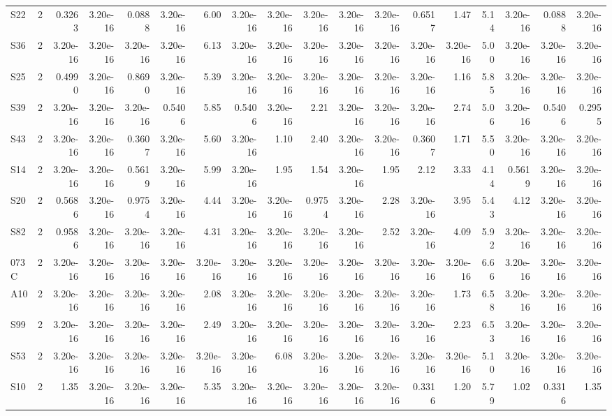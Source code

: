 {\begin{longtable}{lrrrrrrrrrrrrrrrrr}
  S22 & 2 & 0.3263 & 3.20e-16 & 0.0888 & 3.20e-16 & 6.00 & 3.20e-16 & 3.20e-16 & 3.20e-16 & 3.20e-16 & 3.20e-16 & 0.6517 & 1.47 & 5.14 & 3.20e-16 & 0.0888 & 3.20e-16 \\
  S36 & 2 & 3.20e-16 & 3.20e-16 & 3.20e-16 & 3.20e-16 & 6.13 & 3.20e-16 & 3.20e-16 & 3.20e-16 & 3.20e-16 & 3.20e-16 & 3.20e-16 & 3.20e-16 & 5.00 & 3.20e-16 & 3.20e-16 & 3.20e-16 \\
  S25 & 2 & 0.4990 & 3.20e-16 & 0.8690 & 3.20e-16 & 5.39 & 3.20e-16 & 3.20e-16 & 3.20e-16 & 3.20e-16 & 3.20e-16 & 3.20e-16 & 1.16 & 5.85 & 3.20e-16 & 3.20e-16 & 3.20e-16 \\
  S39 & 2 & 3.20e-16 & 3.20e-16 & 3.20e-16 & 0.5406 & 5.85 & 0.5406 & 3.20e-16 & 2.21 & 3.20e-16 & 3.20e-16 & 3.20e-16 & 2.74 & 5.06 & 3.20e-16 & 0.5406 & 0.2955 \\
  S43 & 2 & 3.20e-16 & 3.20e-16 & 0.3607 & 3.20e-16 & 5.60 & 3.20e-16 & 1.10 & 2.40 & 3.20e-16 & 3.20e-16 & 0.3607 & 1.71 & 5.50 & 3.20e-16 & 3.20e-16 & 3.20e-16 \\
  S14 & 2 & 3.20e-16 & 3.20e-16 & 0.5619 & 3.20e-16 & 5.99 & 3.20e-16 & 1.95 & 1.54 & 3.20e-16 & 1.95 & 2.12 & 3.33 & 4.14 & 0.5619 & 3.20e-16 & 3.20e-16 \\
  S20 & 2 & 0.5686 & 3.20e-16 & 0.9754 & 3.20e-16 & 4.44 & 3.20e-16 & 3.20e-16 & 0.9754 & 3.20e-16 & 2.28 & 3.20e-16 & 3.95 & 5.43 & 4.12 & 3.20e-16 & 3.20e-16 \\
  S82 & 2 & 0.9586 & 3.20e-16 & 3.20e-16 & 3.20e-16 & 4.31 & 3.20e-16 & 3.20e-16 & 3.20e-16 & 3.20e-16 & 2.52 & 3.20e-16 & 4.09 & 5.92 & 3.20e-16 & 3.20e-16 & 3.20e-16 \\
  073C & 2 & 3.20e-16 & 3.20e-16 & 3.20e-16 & 3.20e-16 & 3.20e-16 & 3.20e-16 & 3.20e-16 & 3.20e-16 & 3.20e-16 & 3.20e-16 & 3.20e-16 & 3.20e-16 & 6.66 & 3.20e-16 & 3.20e-16 & 3.20e-16 \\
  A10 & 2 & 3.20e-16 & 3.20e-16 & 3.20e-16 & 3.20e-16 & 2.08 & 3.20e-16 & 3.20e-16 & 3.20e-16 & 3.20e-16 & 3.20e-16 & 3.20e-16 & 1.73 & 6.58 & 3.20e-16 & 3.20e-16 & 3.20e-16 \\
  S99 & 2 & 3.20e-16 & 3.20e-16 & 3.20e-16 & 3.20e-16 & 2.49 & 3.20e-16 & 3.20e-16 & 3.20e-16 & 3.20e-16 & 3.20e-16 & 3.20e-16 & 2.23 & 6.53 & 3.20e-16 & 3.20e-16 & 3.20e-16 \\
  S53 & 2 & 3.20e-16 & 3.20e-16 & 3.20e-16 & 3.20e-16 & 3.20e-16 & 3.20e-16 & 6.08 & 3.20e-16 & 3.20e-16 & 3.20e-16 & 3.20e-16 & 3.20e-16 & 5.10 & 3.20e-16 & 3.20e-16 & 3.20e-16 \\
  S10 & 2 & 1.35 & 3.20e-16 & 3.20e-16 & 3.20e-16 & 5.35 & 3.20e-16 & 3.20e-16 & 3.20e-16 & 3.20e-16 & 3.20e-16 & 0.3316 & 1.20 & 5.79 & 1.02 & 0.3316 & 1.35 \\

\end{longtable}}
